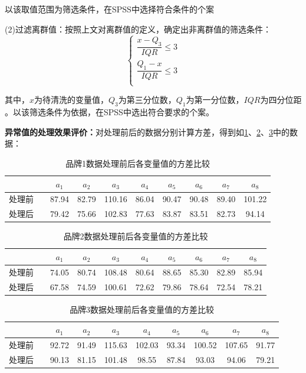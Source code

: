 \documentclass{JXUSTmodeling}
\begin{document}
以该取值范围为筛选条件，在SPSS中选择符合条件的个案

(2)过滤离群值：按照上文对离群值的定义，确定出非离群值的筛选条件：
$$
\left\{
\begin{array}{ll}
\dfrac{x-Q_{3}}{IQR}\leq3\\
\dfrac{Q_{1}-x}{IQR}\leq3 \\
\end{array}
\right.
$$

其中，$ x $为待清洗的变量值，$Q_{3}  $为第三分位数，$ Q_{1} $为第一分位数，$ IQR $为四分位距
。以该筛选条件为依据，在SPSS中选出符合要求的个案。

\textbf{异常值的处理效果评价：}对处理前后的数据分别计算方差，得到如\ref{tab:fc1}、\ref{tab:fc2}、\ref{tab:fc3}中的数据：

\begin{table}[!htbp]
	\centering 
	\caption{\label{tab:fc1}品牌1数据处理前后各变量值的方差比较}
	\begin{tabular}{cccccccccc}
		\toprule[1.5pt]
		 &&$ a_{1} $&$ a_{2} $&$ a_{3} $&$ a_{4} $&$ a_{5} $&$ a_{6} $&$ a_{7} $&$ a_{8} $ \\
		\midrule
		处理前&&87.94&82.79&110.16&86.04&90.47&90.48&89.40&101.22 \\
		处理后&&79.42&75.66&102.83&77.63&83.87&83.51&82.73&94.14 \\
		
		\bottomrule[1.5pt]
	\end{tabular}
\end{table}
\begin{table}[!htbp]
	\centering 
	\caption{\label{tab:fc2}品牌2数据处理前后各变量值的方差比较}
	\begin{tabular}{cccccccccc}
		\toprule[1.5pt]
		&&$ a_{1} $&$ a_{2} $&$ a_{3} $&$ a_{4} $&$ a_{5} $&$ a_{6} $&$ a_{7} $&$ a_{8} $ \\
		\midrule
		处理前&&74.05&80.74&108.48&80.64&88.65&85.30&82.89&85.94 \\
		处理后&&67.58&74.59&100.61&72.62&79.86&78.64&72.54&78.21 \\
		
		\bottomrule[1.5pt]
	\end{tabular}
\end{table}
\begin{table}[!htbp]
	\centering 
	\caption{\label{tab:fc3}品牌3数据处理前后各变量值的方差比较}
	\begin{tabular}{cccccccccc}
		\toprule[1.5pt]
		&&$ a_{1} $&$ a_{2} $&$ a_{3} $&$ a_{4} $&$ a_{5} $&$ a_{6} $&$ a_{7} $&$ a_{8} $ \\
		\midrule
		处理前&&92.72&91.49&115.63&102.03&93.34&100.52&107.65&91.77 \\
		处理后&&90.13&81.15&101.48&98.55&87.84&93.03&94.06&79.21 \\
		
		\bottomrule[1.5pt]
	\end{tabular}
\end{table}
\end{document}
